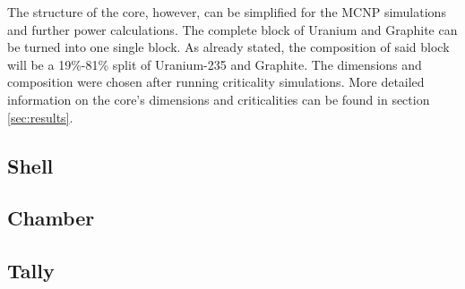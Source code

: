 The structure of the core, however, can be simplified for the MCNP simulations and further power calculations. The complete block of Uranium and Graphite can be turned into one single block. As already stated, the composition of said block will be a 19\%-81\% split of Uranium-235 and Graphite. The dimensions and composition were chosen after running criticality simulations. More detailed information on the core's dimensions and criticalities can be found in section \ref{sec:results}.

\subsection{Shell}
\subsection{Chamber}
\subsection{Tally}
